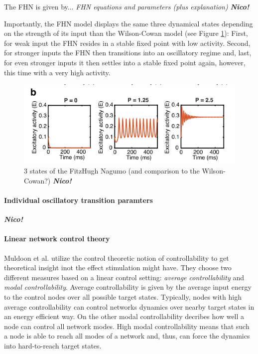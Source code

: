 The FHN is given by...\textit{  FHN equations and parameters (plus explanation)} \textbf{\textit{Nico!}}


Importantly, the FHN model displays the same three dynamical states depending on the strength of its input than the Wilson-Cowan model (see Figure \ref{fig:FHN}): 
First, for weak input the FHN resides in a stable fixed point with low activity. Second, for stronger inputs the FHN then transitions into an oscillatory
regime and, last, for even stronger inputs it then settles into a stable fixed point again, however, this time with a very high activity.

\begin{figure}
\includegraphics{Figures/placeholder}
 \caption{ 3 states of the FitzHugh Nagumo (and comparison to the Wilson-Cowan?) \textbf{\textit{Nico!}}}
 \label{fig:FHN}
\end{figure}


\paragraph{Individual oscillatory transition paramters}
\textbf{\textit{Nico!}}



\paragraph{Linear network control theory}
Muldoon et al. \supercite{Muldoon2016} utilize the control theoretic notion of controllability to get theoretical insight inot the effect stimulation might have.
They choose two different measures based on a linear control setting: \textit{average controllability} and \textit{modal controllability}. Average controllability 
is given by the average input energy to the control nodes over all possible target states. Typically, nodes with high average controllability can control networks 
dynamics over nearby target states in an energy efficient way. On the other modal controllability decribes how well a node can control all network modes. High modal 
controllability means that such a node is able to reach all modes of a network and, thus, can force the dynamics into hard-to-reach target states.

